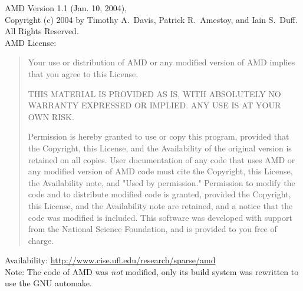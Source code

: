 \documentclass[10pt,a4paper]{ddedoc}
\begin{document}
\noindent
AMD Version 1.1 (Jan. 10, 2004), \\
Copyright (c) 2004 by Timothy A.~Davis, Patrick R.~Amestoy, and Iain S.~Duff. All Rights Reserved. \\[0.5em]
AMD License:
\begin{quote}
Your use or distribution of AMD or any modified version of
AMD implies that you agree to this License.

THIS MATERIAL IS PROVIDED AS IS, WITH ABSOLUTELY NO WARRANTY
EXPRESSED OR IMPLIED.  ANY USE IS AT YOUR OWN RISK.

Permission is hereby granted to use or copy this program, provided
that the Copyright, this License, and the Availability of the original
version is retained on all copies.  User documentation of any code that
uses AMD or any modified version of AMD code must cite the
Copyright, this License, the Availability note, and "Used by permission."
Permission to modify the code and to distribute modified code is granted,
provided the Copyright, this License, and the Availability note are
retained, and a notice that the code was modified is included.  This
software was developed with support from the National Science Foundation,
and is provided to you free of charge.
\end{quote}
\noindent
Availability: \url{http://www.cise.ufl.edu/research/sparse/amd}\\[0.5em]
Note: The code of AMD was \emph{not} modified, only its build system was rewritten to use 
the GNU automake.


 \label{sec:bibliography}
\end{document}

